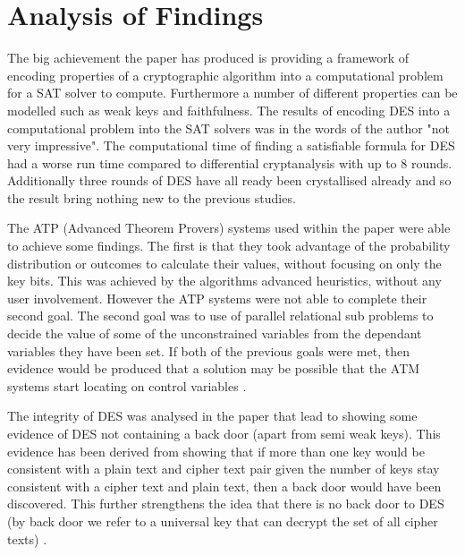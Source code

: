 \documentclass[11pt,a4paper, notitlepage]{report}
\begin{document}
\section{Analysis of Findings}
\label{sec:AnalysisOF}

The big achievement the paper has produced is providing a framework of encoding properties of a cryptographic algorithm into a computational problem for a SAT solver to compute. Furthermore a number of different properties can be modelled such as weak keys and faithfulness. The results of encoding DES into a computational problem into the SAT solvers was in the words of the author "not very impressive". The computational time of finding a satisfiable formula for DES had a worse run time compared to differential cryptanalysis with up to 8 rounds. Additionally three rounds of DES have all ready been crystallised already and so the result bring nothing new to the previous studies. 

The ATP (Advanced Theorem Provers) systems used within the paper were able to achieve some findings. The first is that they took advantage of the probability distribution or outcomes to calculate their values, without focusing on only the key bits. This was achieved by the algorithms advanced heuristics, without any user involvement. However the ATP systems were not able to complete their second goal. The second goal was to use of parallel relational sub problems to decide the value of some of the unconstrained variables from the dependant variables they have been set. If both of the previous goals were met, then evidence would be produced that a solution may be possible that the ATM systems start locating on control variables \cite{Fabio2000LogicalSAT}. 
  
The integrity of DES was analysed in the paper that lead to showing some evidence of DES not containing a back door (apart from semi weak keys). This evidence has been derived from showing that if more than one key would be consistent with a plain text and cipher text pair given the number of keys stay consistent with a cipher text and plain text, then a back door would have been discovered. This further strengthens the idea that there is no back door to DES (by back door we refer to a universal key that can decrypt the set of all cipher texts) \cite{Fabio2000LogicalSAT}. 
 
\end{document}
